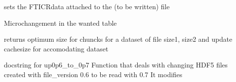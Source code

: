 \documentclass[letterpaper,10pt,openany,oneside]{sphinxmanual}
\begin{document}
\begin{fulllineitems}

\begin{fulllineitems}
\label{rst/code:File.HDF5File.HDF5File.set_data_from_fticrd}
sets the FTICRdata attached to the (to be written) file

\end{fulllineitems}


\begin{fulllineitems}
\label{rst/code:File.HDF5File.HDF5File.table_update}
Microchangement in the wanted table

\end{fulllineitems}


\end{fulllineitems}


\begin{fulllineitems}
\label{rst/code:File.HDF5File.determine_chunkshape}
returns optimum size for chuncks for a dataset of file size1, size2
and update cachesize for accomodating dataset

\end{fulllineitems}


\begin{fulllineitems}
\label{rst/code:File.HDF5File.nparray_to_fticrd}
\end{fulllineitems}


\begin{fulllineitems}
\label{rst/code:File.HDF5File.up0p6_to_0p7}
docstring for up0p6\_to\_0p7
Function that deals with changing HDF5 files created with file\_version 0.6 to be read with 0.7
It modifies

\end{fulllineitems}
\end{document}
